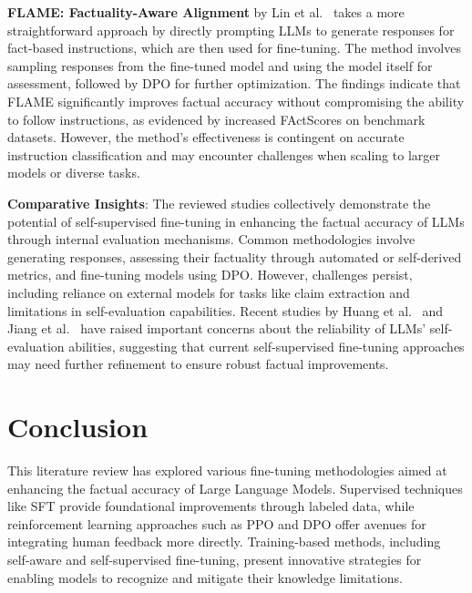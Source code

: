 \documentclass{article}
\begin{document}
\textbf{FLAME: Factuality-Aware Alignment} by Lin et al.~\cite{lin_flame_2024} takes a more straightforward approach by directly prompting LLMs to generate responses for fact-based instructions, which are then used for fine-tuning. The method involves sampling responses from the fine-tuned model and using the model itself for assessment, followed by DPO for further optimization. The findings indicate that FLAME significantly improves factual accuracy without compromising the ability to follow instructions, as evidenced by increased FActScores on benchmark datasets. However, the method's effectiveness is contingent on accurate instruction classification and may encounter challenges when scaling to larger models or diverse tasks.

\textbf{Comparative Insights}: The reviewed studies collectively demonstrate the potential of self-supervised fine-tuning in enhancing the factual accuracy of LLMs through internal evaluation mechanisms. Common methodologies involve generating responses, assessing their factuality through automated or self-derived metrics, and fine-tuning models using DPO. However, challenges persist, including reliance on external models for tasks like claim extraction and limitations in self-evaluation capabilities. Recent studies by Huang et al.~\cite{LargeLanguageModelsCannotSelfCorrect2024} and Jiang et al.~\cite{SELFINCORRECTLLMsStruggleDiscriminatingSelfGenerated2024} have raised important concerns about the reliability of LLMs' self-evaluation abilities, suggesting that current self-supervised fine-tuning approaches may need further refinement to ensure robust factual improvements.

\section{Conclusion}

This literature review has explored various fine-tuning methodologies aimed at enhancing the factual accuracy of Large Language Models. Supervised techniques like SFT provide foundational improvements through labeled data, while reinforcement learning approaches such as PPO and DPO offer avenues for integrating human feedback more directly. Training-based methods, including self-aware and self-supervised fine-tuning, present innovative strategies for enabling models to recognize and mitigate their knowledge limitations.
\end{document}
